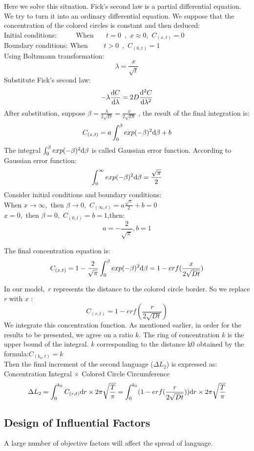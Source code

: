 \documentclass{mcmthesis}
\begin{document}
    Here we solve this situation.
    Fick's second law is a partial differential equation.
    We try to turn it into an ordinary differential equation.
    We suppose that the concentration of the colored circles is constant and then deduced:
    \\Initial conditions: \ \ \ \ \  When \ \ \ $t=0$\ ,\ $x\approx 0$,\ $C_{(x,t)}=0$
    \\Boundary conditions: When \ \ \ \ $t>0$\ ,\ $C_{(0,t)}=1$%
    \\Using Boltzmann transformation:
    $$\lambda=\frac{x}{\sqrt{t}}$$
    Substitute Fick's second law:
    $$-\lambda\frac{{\rm d}C}{{\rm d}\lambda}=2D\frac{{\rm d}^2C}{{\rm d}\lambda^2}$$
    After substitution, suppose $\beta=\frac{\lambda}{2\sqrt{D}}=\frac{x}{2\sqrt{Dt}}$ ,
    the result of the final integration is:
    $$C_{(x,t)}=a\int_0^\beta exp(-\beta)^2{\rm d}\beta+b$$
    The integral $\int_0^\beta exp(-\beta)^2{\rm d}\beta$ is called Gaussian error function.
    According to Gaussian error function:
    $$\int_0^\infty exp(-\beta)^2{\rm d}\beta=\frac{\sqrt{\pi}}{2}$$
    Consider initial conditions and boundary conditions:
    \\When $x\rightarrow\infty$,\ then $\beta\rightarrow 0$,\ $C_{(\infty,t)}=a\frac{\sqrt{\pi}}{2}+b=0$
    \\$x=0$,\ then $\beta=0$,\ $C_{(0,t)}=b=1$,then:
    $$a=-\frac{2}{\sqrt{\pi}},b=1$$

    The final concentration equation is:
    $$C_{(x,t)}=1-\frac{2}{\sqrt{\pi}}\int_0^\beta exp(-\beta)^2{\rm d}\beta=1-erf(\frac{x}{2\sqrt{Dt}})$$

    In our model,\ $r$ represents the distance to the colored circle border.
    So we replace $r$ with $x$ :
    $$C_{(r,t)}=1-erf(\frac{r}{2\sqrt{Dt}})$$
    We integrate this concentration function.
    As mentioned earlier, in order for the results to be presented, we agree on a ratio $k$.
    The ring of concentration $k$ is the upper bound of the integral.
    $k$ corresponding to the distance k0 obtained by the formula:$C_{(k_0,t)}=k$
    \\Then the final increment of the second language ($\Delta L_2$) is expressed as:
    Concentration Integral × Colored Circle Circumference
    $$\Delta L_2=\int_0^{k_0} C_{(r,t)}{\rm d}r\times 2\pi\sqrt{\frac{T}{\pi}}=\int_0^{k_0}(1-erf(\frac{r}{2\sqrt{Dt}})){\rm d}r\times 2\pi\sqrt{\frac{T}{\pi}}$$





    \subsection{Design of Influential Factors}%
    A large number of objective factors will affect the spread of language.
\end{document}
